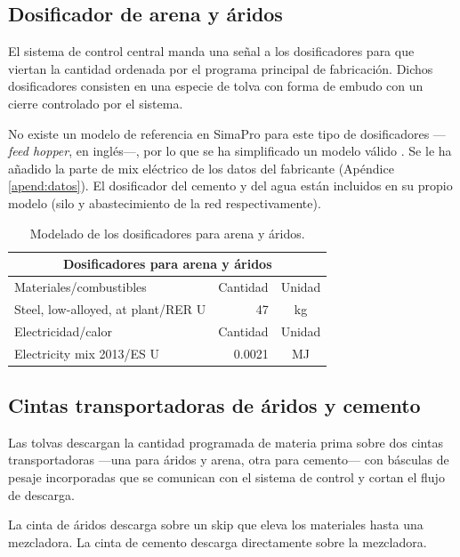 \subsection{Dosificador de arena y áridos}

El sistema de control central manda una señal a los dosificadores para que viertan la cantidad ordenada por el programa principal de fabricación. Dichos dosificadores consisten en una especie de tolva con forma de embudo con un cierre controlado por el sistema.

No existe un modelo de referencia en SimaPro para este tipo de dosificadores —\textit{feed hopper}, en inglés—, por lo que se ha simplificado un modelo válido \cite{woodpellet}. Se le ha añadido la parte de mix eléctrico de los datos del fabricante (Apéndice \ref{apend:datos}). El dosificador del cemento y del agua están incluidos en su propio modelo (silo y abastecimiento de la red respectivamente).

\begin{table}[!htb]
\centering
\begin{tabular}{p{8cm}rc}
\toprule
\multicolumn{3}{c}{Dosificadores para arena y áridos}\\
\midrule
Materiales/combustibles & Cantidad & Unidad\\
\midrule
Steel, low-alloyed, at plant/RER U & 47 & \si{kg}\\
\midrule
Electricidad/calor & Cantidad & Unidad\\
\midrule
Electricity mix 2013/ES U & 0.0021 & \si{MJ}\\
\bottomrule
\end{tabular}
\caption{Modelado de los dosificadores para arena y áridos.}
\label{modeladodedosificadores}
\end{table}

\subsection{Cintas transportadoras de áridos y cemento}

Las tolvas descargan la cantidad programada de materia prima sobre dos cintas transportadoras —una para áridos y arena, otra para cemento— con básculas de pesaje incorporadas que se comunican con el sistema de control y cortan el flujo de descarga.

La cinta de áridos descarga sobre un skip que eleva los materiales hasta una mezcladora. La cinta de cemento descarga directamente sobre la mezcladora.

